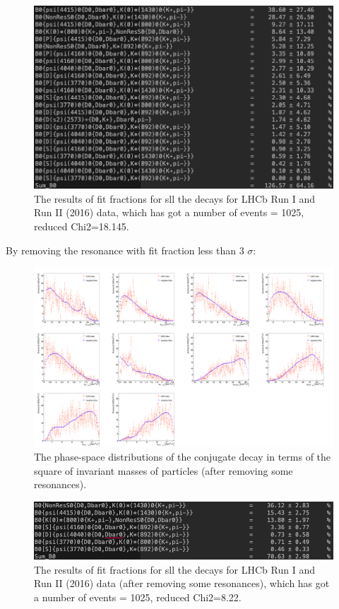 \begin{figure}[h]
\center
\includegraphics*[width=0.96\linewidth]{amplitude_fit/fit_fraction_all}
\caption{The results of fit fractions for sll the decays for LHCb Run I and Run II (2016) data, which has got a number of events = 1025, reduced Chi2=18.145.}
\label{fit_fraction_all}
\end{figure}
\clearpage
\noindent By removing the resonance with fit fraction less than 3 $\sigma$:
\begin{figure}[h]
\center
\includegraphics*[width=1.06\linewidth]{amplitude_fit/compare_all2}
\caption{The phase-space distributions of the conjugate decay in terms of the square of invariant masses of particles (after removing some resonances).}
\label{compare_all2}
\end{figure}
\begin{figure}[h]
\center
\includegraphics*[width=0.96\linewidth]{amplitude_fit/fit_fraction_all2}
\caption{The results of fit fractions for sll the decays for LHCb Run I and Run II (2016) data (after removing some resonances), which has got a number of events = 1025, reduced Chi2=8.22.}
\label{fit_fraction_all2}
\end{figure}
